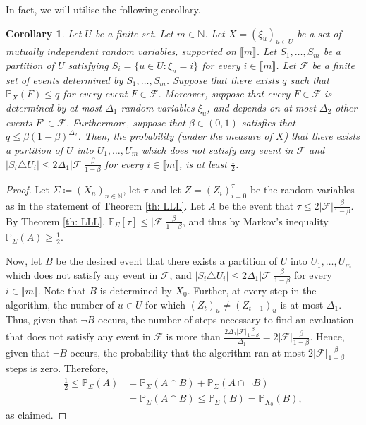 \documentclass[notitlepage]{scrartcl}
\newcommand{\br}[1]{\llbracket{#1}\rrbracket}
\newtheorem{corollary}[thm]{Corollary}
\begin{document}
In fact, we will utilise the following corollary.
\begin{corollary}\label{cor: lll}
Let $U$ be a finite set. Let $m\in \mathbb{N}$. Let $X=(\xi_u)_{u\in U}$ be a set of mutually independent random variables, supported on $\br{m}$. Let $S_1,\ldots, S_{m}$ be a partition of $U$ satisfying $S_i=\{u\in U\colon \xi_u=i\}$ for every $i \in \br{m}$. Let $\mathcal{F}$ be a finite set of events determined by $S_1,\ldots, S_m$. Suppose that there exists $q$ such that $\mathbb{P}_X(F)\le q$ for every event $F\in \mathcal{F}$. Moreover, suppose that every $F\in \mathcal{F}$ is determined by at most $\Delta_1$ random variables $\xi_u$, and depends on at most $\Delta_2$ other events $F'\in \mathcal{F}$. Furthermore, suppose that $\beta\in (0,1)$ satisfies that $q\le \beta(1-\beta)^{\Delta_2}$. 
Then, the probability (under the measure of $X$) that there exists a partition of $U$ into $U_1,\ldots, U_m$ which does not satisfy any event in $\mathcal{F}$ and $\big|S_i\triangle U_i\big|\le 2\Delta_1|\mathcal{F}|\frac{\beta}{1-\beta}$ for every $i\in \br{m}$, is at least $\frac{1}{2}$.
\end{corollary}
\begin{proof}
Let $\Sigma\coloneqq (X_n)_{n\in \mathbb{N}}$, let $\tau$ and let $Z=(Z_i)_{i=0}^{\tau}$ be the random variables as in the statement of Theorem \ref{th: LLL}. Let $A$ be the event that $\tau \le 2|\mathcal{F}|\frac{\beta}{1-\beta}$. By Theorem \ref{th: LLL}, $\mathbb{E}_{\Sigma}\left[\tau\right]\le |\mathcal{F}|\frac{\beta}{1-\beta}$, and thus by Markov's inequality 
$\mathbb{P}_{\Sigma}(A)\ge\frac{1}{2}$. 

Now, let $B$ be the desired event that there exists a partition of $U$ into $U_1,\ldots, U_m$ which does not satisfy any event in $\mathcal{F}$, and $\big|S_i\triangle U_i\big|\le 2\Delta_1|\mathcal{F}|\frac{\beta}{1-\beta}$ for every $i\in \br{m}$. Note that $B$ is determined by $X_0$. Further, at every step in the algorithm, the number of $u\in U$ for which $(Z_t)_u\neq (Z_{t-1})_u$ is at most $\Delta_1$. Thus, given that $\neg B$ occurs, the number of steps necessary to find an evaluation that does not satisfy any event in $\mathcal{F}$ is more than $\frac{2\Delta_1|\mathcal{F}|\frac{\beta}{1-\beta}}{\Delta_1}=2|\mathcal{F}|\frac{\beta}{1-\beta}$. Hence, given that $\neg B$ occurs, the probability that the algorithm ran at most $2|\mathcal{F}|\frac{\beta}{1-\beta}$ steps is zero. Therefore,
\begin{align*}
   \frac{1}{2}\le \mathbb{P}_{\Sigma}(A)&=\mathbb{P}_{\Sigma}(A\cap B)+\mathbb{P}_{\Sigma}(A\cap \neg B)\\
    &=\mathbb{P}_{\Sigma}(A\cap B)\le \mathbb{P}_{\Sigma}(B)=\mathbb{P}_{X_0}(B),
\end{align*}
as claimed.
\end{proof}
\end{document}
